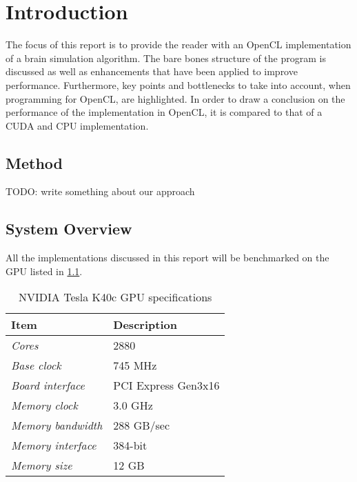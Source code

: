 \documentclass[final]{report}
\begin{document}
\chapter{Introduction}

The focus of this report is to provide the reader with an OpenCL implementation of a brain simulation algorithm.
The bare bones structure of the program is discussed as well as enhancements that have been applied to improve performance.
Furthermore, key points and bottlenecks to take into account, when programming for OpenCL, are highlighted. 
In order to draw a conclusion on the performance of the implementation in OpenCL, it is compared to that of a CUDA and CPU implementation.

\section{Method}

TODO: write something about our approach




\section{System Overview}
All the implementations discussed in this report will be benchmarked on the GPU listed in \cref{tab:gpu-specs}.

\begin{table}[H]
	\centering
	\caption{NVIDIA Tesla K40c GPU specifications}
	\label{tab:gpu-specs}
	\begin{tabular}{ll}
		\toprule
			\textbf{Item} &\textbf{Description}\\
		\midrule
			\textit{Cores} & 2880	\\
			\textit{Base clock} & 745 MHz \\
			\textit{Board interface} & PCI Express Gen3x16 \\
			\textit{Memory clock} & 3.0 GHz \\
			\textit{Memory bandwidth} & 288 GB/sec \\
			\textit{Memory interface} & 384-bit \\
			\textit{Memory size} & 12 GB \\
		\bottomrule
	\end{tabular}
\end{table}
\end{document}
